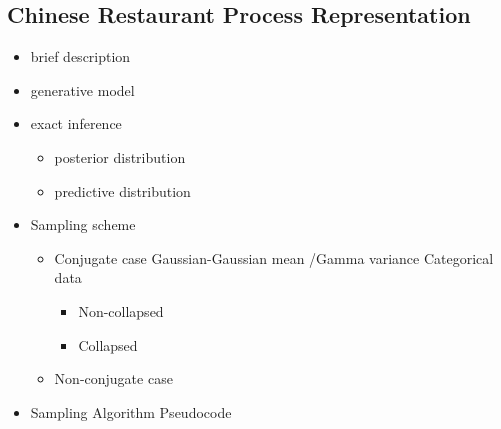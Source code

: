 \subsection{Chinese Restaurant Process Representation}
\begin{itemize}
	\item brief description
	\item generative model
	\item exact inference
		\begin{itemize}
			\item posterior distribution
			\item predictive distribution
		\end{itemize}
	\item Sampling scheme
		\begin{itemize}
			\item Conjugate case
			Gaussian-Gaussian mean /Gamma variance
			Categorical data			
			\begin{itemize}
				\item Non-collapsed
				\item Collapsed
			\end{itemize}
			\item Non-conjugate case
		\end{itemize}
	\item Sampling Algorithm Pseudocode \cite{neal2000markov}
\end{itemize}